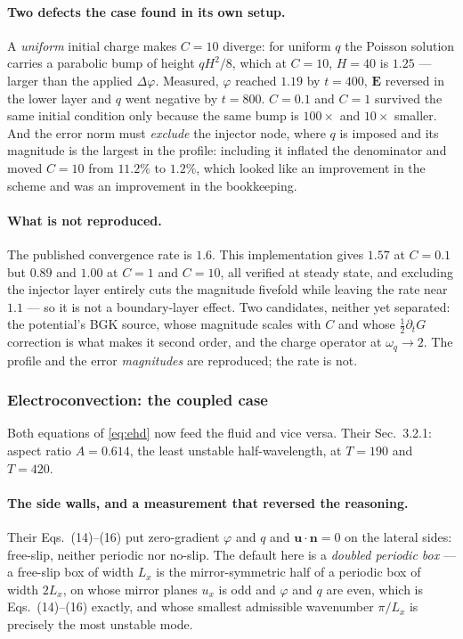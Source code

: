 \documentclass[11pt,a4paper]{article}
\newcommand{\uu}{\bm{u}}
\newcommand{\nn}{\bm{n}}
\begin{document}
\paragraph{Two defects the case found in its own setup.} A \emph{uniform} initial
charge makes $C=10$ diverge: for uniform $q$ the Poisson solution carries a
parabolic bump of height $qH^2/8$, which at $C=10$, $H=40$ is $1.25$ --- larger
than the applied $\Delta\varphi$. Measured, $\varphi$ reached $1.19$ by $t=400$,
$\bm{E}$ reversed in the lower layer and $q$ went negative by $t=800$. $C=0.1$
and $C=1$ survived the same initial condition only because the same bump is
$100\times$ and $10\times$ smaller. And the error norm must \emph{exclude} the
injector node, where $q$ is imposed and its magnitude is the largest in the
profile: including it inflated the denominator and moved $C=10$ from $11.2\%$ to
$1.2\%$, which looked like an improvement in the scheme and was an improvement in
the bookkeeping.

\paragraph{What is not reproduced.} The published convergence rate is $1.6$. This
implementation gives $1.57$ at $C=0.1$ but $0.89$ and $1.00$ at $C=1$ and $C=10$,
all verified at steady state, and excluding the injector layer entirely cuts the
magnitude fivefold while leaving the rate near $1.1$ --- so it is not a
boundary-layer effect. Two candidates, neither yet separated: the potential's BGK
source, whose magnitude scales with $C$ and whose $\tfrac12\partial_tG$ correction
is what makes it second order, and the charge operator at $\omega_q\to2$. The
profile and the error \emph{magnitudes} are reproduced; the rate is not.

\subsubsection{Electroconvection: the coupled case}
\label{sec:ehdconv}

Both equations of \eqref{eq:ehd} now feed the fluid and vice versa. Their
Sec.~3.2.1: aspect ratio $A=0.614$, the least unstable half-wavelength, at
$T=190$ and $T=420$.

\paragraph{The side walls, and a measurement that reversed the reasoning.}
Their Eqs.~(14)--(16) put zero-gradient $\varphi$ and $q$ and
$\uu\!\cdot\!\nn=0$ on the lateral sides: free-slip, neither periodic nor
no-slip. The default here is a \emph{doubled periodic box} --- a free-slip box of
width $L_x$ is the mirror-symmetric half of a periodic box of width $2L_x$, on
whose mirror planes $u_x$ is odd and $\varphi$ and $q$ are even, which is
Eqs.~(14)--(16) exactly, and whose smallest admissible wavenumber $\pi/L_x$ is
precisely the most unstable mode.
\end{document}
